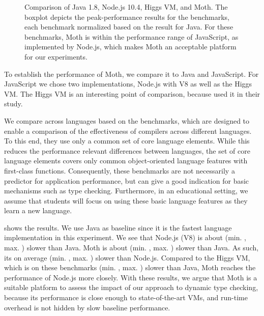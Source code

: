 \begin{figure}
	\AwfyBaseline{}
	\caption{Comparison of Java 1.8, Node.js 10.4, Higgs VM, and Moth.
  The boxplot depicts the peak-performance results for the \AWFY benchmarks,
  each benchmark normalized based on the result for Java.
  For these benchmarks, Moth is within the performance range
  of JavaScript, as implemented by Node.js,
  which makes Moth an acceptable platform for our experiments.}
	\label{fig:awfy-baseline}
\end{figure}

To establish the performance of Moth,
we compare it to Java and JavaScript.
For JavaScript we chose two implementations,
Node.js with V8 as well as the Higgs VM.
The Higgs VM is an interesting point of comparison,
because \citet{Richards2017} used it in their study.

We compare across languages based on the \AWFY benchmarks\citep{Marr2016},
which are designed to enable a comparison
of the effectiveness of compilers across different languages.
To this end, they use only a common set of core language elements.
While this reduces the performance relevant differences between languages,
the set of core language elements covers only common object-oriented language
features with first-class functions.
Consequently, these benchmarks are not necessarily a predictor
for application performance,
but can give a good indication for basic mechanisms such as type checking.
Furthermore, in an educational setting,
we assume that students will focus on using these basic language features
as they learn a new language.

 shows the results.
We use Java as baseline since it is the fastest language implementation
in this experiment.
We see that Node.js (V8) is about
\OverheadNodeGMeanX (min. \OverheadNodeMinX, max. \OverheadNodeMaxX)
slower than Java.
Moth is about \OverheadMothGMeanX (min. \OverheadMothMinX, max. \OverheadMothMaxX) slower than Java.
As such, its on average \OverheadMothNodeGMeanP (min. \OverheadMothNodeMinP, max. \OverheadMothNodeMaxX) slower than Node.js.
Compared to the Higgs VM, which is on these benchmarks
\OverheadHiggsGMeanX (min. \OverheadHiggsMinX, max. \OverheadHiggsMaxX) slower than Java,
Moth reaches the performance of Node.js more closely.
With these results, we argue that Moth is a suitable platform to
assess the impact of our approach to dynamic type checking,
because its performance is close enough to state-of-the-art VMs,
and run-time overhead is not hidden by slow baseline performance.


